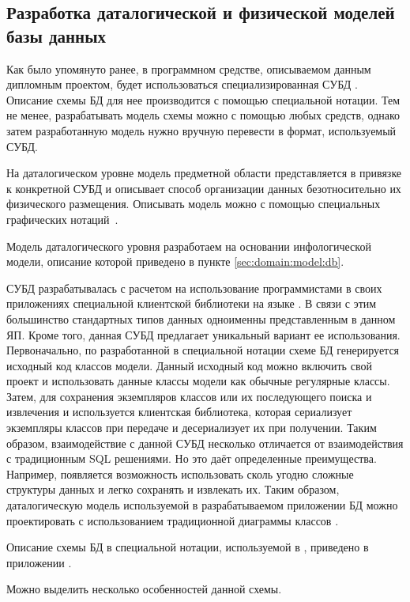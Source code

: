 \subsection{Разработка даталогической и физической моделей базы данных}
\label{sec:design:db}

Как было упомянуто ранее, в программном средстве, описываемом данным дипломным проектом, будет использоваться специализированная СУБД \nezaboodka. Описание схемы БД для нее производится с помощью специальной нотации. Тем не менее, разрабатывать модель схемы можно с помощью любых средств, однако затем разработанную модель нужно вручную перевести в формат, используемый СУБД. 

На даталогическом уровне модель предметной области представляется в привязке к конкретной СУБД и описывает способ организации данных безотносительно их физического размещения. Описывать модель можно с помощью специальных графических нотаций~\cite{kulikov_db_workbook}. 

Модель даталогического уровня разработаем на основании инфологической модели, описание которой приведено в пункте \ref{sec:domain:model:db}. 

СУБД \nezaboodka разрабатывалась с расчетом на использование программистами в своих приложениях специальной клиентской библиотеки на языке \csharp. В связи с этим большинство стандартных типов данных одноименны представленным в данном ЯП. Кроме того, данная СУБД предлагает уникальный вариант ее использования. Первоначально, по разработанной в специальной нотации схеме БД генерируется исходный код классов модели. Данный исходный код можно включить свой проект и использовать данные классы модели как обычные регулярные классы. Затем, для сохранения экземпляров классов или их последующего поиска и извлечения и используется клиентская библиотека, которая сериализует экземпляры классов при передаче и десериализует их при получении. Таким образом, взаимодействие с данной СУБД несколько отличается от взаимодействия с традиционным SQL решениями. Но это даёт определенные преимущества. Например, появляется возможность использовать сколь угодно сложные структуры данных и легко сохранять и извлекать их. Таким образом, даталогическую модель используемой в разрабатываемом приложении БД можно проектировать с использованием традиционной диаграммы классов \uml.

Описание схемы БД в специальной нотации, используемой в \nezaboodka, приведено в приложении \dbschemeappendix. 

Можно выделить несколько особенностей данной схемы. 

